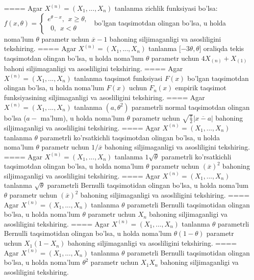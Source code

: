 ====
Agar \(X^{(n)} = \left( X_{1},...,X_{n} \right)\) tanlanma zichlik funksiyasi bo'lsa: \(f(x,\theta) = \left\{ \begin{matrix}
e^{\theta - x},\ \ x \geq \theta, \\
\ \ 0,\ \ x < \theta
\end{matrix} \right.\ \) bo'lgan taqsimotdan olingan bo'lsa, u holda noma'lum \(\theta\) parametr uchun \(\overline{x} - 1\) bahoning siljimaganligi va asosliligini tekshiring.
====
Agar \(X^{(n)} = \left( X_{1},...,X_{n} \right)\) tanlanma \(\lbrack - 3\theta,\theta\rbrack\) oraliqda tekis taqsimotdan olingan bo'lsa, u holda noma'lum \(\theta\) parametr uchun \(4X_{(n)} + X_{(1)}\) bahoni siljimaganligi va asosliligini tekshiring.
====
Agar \(X^{(n)} = \left( X_{1},...,X_{n} \right)\) tanlanma taqsimot funksiyasi \(F(x)\) bo'lgan taqsimotdan olingan bo'lsa, u holda noma'lum \(F(x)\) uchun \(F_{n}(x)\) empirik taqsimot funksiyasining siljimaganligi va asosliligini tekshiring.
====
Agar \(X^{(n)} = \left( X_{1},...,X_{n} \right)\) tanlanma \(\left( a,\theta^{2} \right)\) parametrli normal taqsimotdan olingan bo'lsa (\(a -\) ma'lum), u holda noma'lum \(\theta\) parametr uchun \(\sqrt{\frac{\pi}{2}}\left| \overline{x - a} \right|\) bahoning siljimaganligi va asosliligini tekshiring.
====
Agar \(X^{(n)} = \left( X_{1},...,X_{n} \right)\) tanlanma \(\theta\) parametrli ko'rsatkichli taqsimotdan olingan bo'lsa, u holda noma'lum \(\theta\) parametr uchun \(1/\overline{x}\) bahoning siljimaganligi va asosliligini tekshiring.
====
Agar \(X^{(n)} = \left( X_{1},...,X_{n} \right)\) tanlanma \(1\sqrt{\theta}\) parametrli ko'rsatkichli taqsimotdan olingan bo'lsa, u holda noma'lum \(\theta\) parametr uchun \((\overline{x})^{2}\) bahoning siljimaganligi va asosliligini tekshiring.
====
Agar \(X^{(n)} = \left( X_{1},...,X_{n} \right)\) tanlanma \(\sqrt{\theta}\) parametrli Bernulli taqsimotidan olingan bo'lsa, u holda noma'lum \(\theta\) parametr uchun \((\overline{x})^{2}\) bahoning siljimaganligi va asosliligini tekshiring.
====
Agar \(X^{(n)} = \left( X_{1},...,X_{n} \right)\) tanlanma \(\theta\) parametrli Bernulli taqsimotidan olingan bo'lsa, u holda noma'lum \(\theta\) parametr uchun \(X_{n}\) bahoning siljimaganligi va asosliligini tekshiring.
====
Agar \(X^{(n)} = \left( X_{1},...,X_{n} \right)\) tanlanma \(\theta\) parametrli Bernulli taqsimotidan olingan bo'lsa, u holda noma'lum \(\theta(1 - \theta)\) parametr uchun \(X_{1}\left( 1 - X_{n} \right)\) bahoning siljimaganligi va asosliligini tekshiring.
====
Agar \(X^{(n)} = \left( X_{1},...,X_{n} \right)\) tanlanma \(\theta\) parametrli Bernulli taqsimotidan olingan bo'lsa, u holda noma'lum \(\theta^{2}\) parametr uchun \(X_{1}X_{n}\) bahoning siljimaganligi va asosliligini tekshiring.
